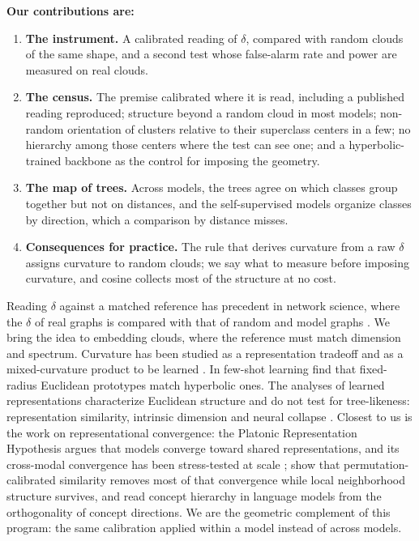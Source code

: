\documentclass{article}
\makeatletter
\theoremstyle{inline}
\theoremstyle{inlineit}
\renewcommand\section{\@startsection{section}{1}{\z@}{-0.3ex plus -0.3ex minus -.2ex}{0.2ex plus 0.2ex minus 0.1ex}{\large\sc\raggedright}}
\makeatother
\begin{document}
\textbf{Our contributions are:}
\begin{enumerate}[topsep=0pt,itemsep=1pt,leftmargin=*]
\item \textbf{The instrument.} A calibrated reading of $\delta$, compared with random clouds of the same shape, and a second test whose false-alarm rate and power are measured on real clouds.
\item \textbf{The census.} The premise calibrated where it is read, including a published reading reproduced; structure beyond a random cloud in most models; non-random orientation of clusters relative to their superclass centers in a few; no hierarchy among those centers where the test can see one; and a hyperbolic-trained backbone as the control for imposing the geometry.
\item \textbf{The map of trees.} Across models, the trees agree on which classes group together but not on distances, and the self-supervised models organize classes by direction, which a comparison by distance misses.
\item \textbf{Consequences for practice.} The rule that derives curvature from a raw $\delta$ assigns curvature to random clouds; we say what to measure before imposing curvature, and cosine collects most of the structure at no cost.
\end{enumerate}

\section{Related Work}
\label{sec:related}

Reading $\delta$ against a matched reference has precedent in network science, where the $\delta$ of real graphs is compared with that of random and model graphs \citep{narayan2011curvature, kennedy2013hyperbolicity, adcock2013treelike}. We bring the idea to embedding clouds, where the reference must match dimension and spectrum. Curvature has been studied as a representation tradeoff \citep{sala2018representation} and as a mixed-curvature product to be learned \citep{gu2019learning}. In few-shot learning \citet{moreira2024hyperbolic} find that fixed-radius Euclidean prototypes match hyperbolic ones. The analyses of learned representations characterize Euclidean structure and do not test for tree-likeness: representation similarity, intrinsic dimension and neural collapse \citep{kornblith2019cka, ansuini2019intrinsic, pope2021intrinsic, papyan2020prevalence}. Closest to us is the work on representational convergence: the Platonic Representation Hypothesis \citep{huh2024platonic} argues that models converge toward shared representations, and its cross-modal convergence has been stress-tested at scale \citep{koepke2026cave}; \citet{groger2026aristotelian} show that permutation-calibrated similarity removes most of that convergence while local neighborhood structure survives, and \citet{park2024geometry} read concept hierarchy in language models from the orthogonality of concept directions. We are the geometric complement of this program: the same calibration applied within a model instead of across models.
\end{document}
